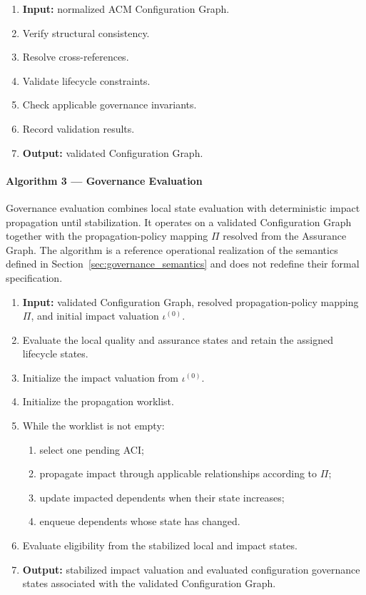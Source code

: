 \documentclass[10pt]{article}
\begin{document}
\begin{algorithm}[t]
	\caption{Configuration Validation}
	\begin{enumerate}
		\item \textbf{Input:} normalized ACM Configuration Graph.
		\item Verify structural consistency.
		\item Resolve cross-references.
		\item Validate lifecycle constraints.
		\item Check applicable governance invariants.
		\item Record validation results.
		\item \textbf{Output:} validated Configuration Graph.
	\end{enumerate}
\end{algorithm}

\paragraph{Algorithm 3 --- Governance Evaluation}

Governance evaluation combines local state evaluation with deterministic impact
propagation until stabilization. It operates on a validated Configuration Graph
together with the propagation-policy mapping $\Pi$ resolved from the Assurance
Graph. The algorithm is a reference operational realization of the semantics
defined in Section~\ref{sec:governance_semantics} and does not redefine their
formal specification.

\begin{algorithm}[t]
	\caption{Governance Evaluation}
	\begin{enumerate}
		\item \textbf{Input:} validated Configuration Graph, resolved propagation-policy mapping $\Pi$, and initial impact valuation $\iota^{(0)}$.
		\item Evaluate the local quality and assurance states and retain the assigned lifecycle states.
		\item Initialize the impact valuation from $\iota^{(0)}$.
		\item Initialize the propagation worklist.
		\item While the worklist is not empty:
		\begin{enumerate}
			\item select one pending ACI;
			\item propagate impact through applicable relationships according to $\Pi$;
			\item update impacted dependents when their state increases;
			\item enqueue dependents whose state has changed.
		\end{enumerate}
		\item Evaluate eligibility from the stabilized local and impact states.
		\item \textbf{Output:} stabilized impact valuation and evaluated configuration governance states associated with the validated Configuration Graph.
	\end{enumerate}
\end{algorithm}
\end{document}
